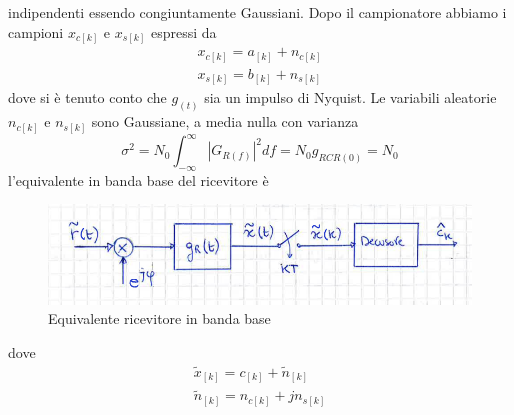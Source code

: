             indipendenti essendo congiuntamente Gaussiani. Dopo il campionatore abbiamo i campioni $x_{c[k]}$ e $x_{s[k]}$ espressi da 
            \begin{gather}
                x_{c[k]} = a_{[k]}+n_{c[k]}\nonumber \\
                x_{s[k]} = b_{[k]}+n_{s[k]}\nonumber
            \end{gather}
            dove si è tenuto conto che $g_{(t)}$ sia un impulso di Nyquist. Le variabili aleatorie $n_{c[k]}$ e $n_{s[k]}$ sono 
            Gaussiane, a media nulla con varianza 
            \[
                \sigma^2 = N_0\int_{-\infty}^{\infty}\left|G_{R(f)}\right|^2df= N_0g_{RCR(0)} = N_0
            \]
            l'equivalente in banda base del ricevitore è 
            \begin{figure}[H]
                \centering
                \includegraphics[width = 12cm]{media/equivalente in banda base ricevitore qam.png}
                \caption{Equivalente ricevitore in banda base}
            \end{figure}
            dove
            \begin{gather}
                \tilde{x}_{[k]} = c_{[k]}+\tilde{n}_{[k]} \nonumber \\
                \tilde{n}_{[k]} = n_{c[k]}+jn_{s[k]} \nonumber 
            \end{gather}
